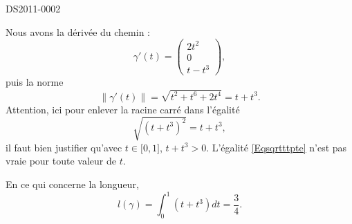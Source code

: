 \begin{corrige}{DS2011-0002}
  
    Nous avons la dérivée du chemin :
    \begin{equation}
        \gamma'(t)=\begin{pmatrix}
            2t^2    \\ 
            0    \\ 
            t-t^3    
        \end{pmatrix},
    \end{equation}
    puis la norme
    \begin{equation}
        \| \gamma'(t) \|=\sqrt{t^2+t^6+2t^4}=t+t^3.
    \end{equation}
    Attention, ici pour enlever la racine carré dans l'égalité
    \begin{equation}    \label{Eqsqrtttpte}
        \sqrt{(t+t^3)^2}=t+t^3,
    \end{equation}
    il faut bien justifier qu'avec \( t\in\mathopen[ 0 , 1 \mathclose]\), \( t+t^3>0\). L'égalité \eqref{Eqsqrtttpte} n'est pas vraie pour toute valeur de \( t\).

    En ce qui concerne la longueur,
    \begin{equation}
        l(\gamma)=\int_0^1(t+t^3)dt=\frac{ 3 }{ 4 }.
    \end{equation}

\end{corrige}
